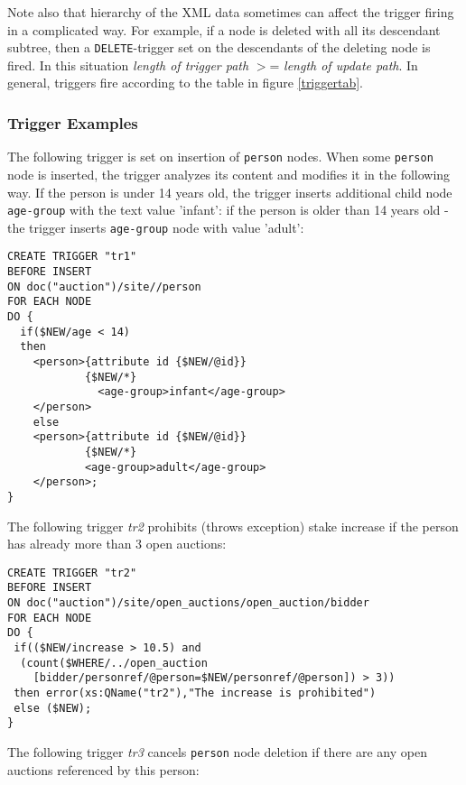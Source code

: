 \documentclass[a4paper,12pt]{article}
\begin{document}
Note also that hierarchy of the XML data sometimes can affect the trigger firing
in a complicated way. For example, if a node is deleted with all its descendant
subtree, then a \verb!DELETE!-trigger set on the descendants of the deleting
node is fired. In this situation \emph{length of trigger path} $>$= \emph{length
of update path}. In general, triggers fire according to the table in figure
\ref{triggertab}.


\subsubsection{Trigger Examples}

The following trigger is set on insertion of \verb!person! nodes. When some
\verb!person! node is inserted, the trigger analyzes its content and modifies it
in the following way. If the person is under 14 years old, the trigger inserts
additional child node \verb!age-group! with the text value 'infant': if the
person is older than 14 years old - the trigger inserts \verb!age-group! node
with value 'adult':

\small{
\begin{verbatim}
CREATE TRIGGER "tr1"
BEFORE INSERT
ON doc("auction")/site//person
FOR EACH NODE
DO {
  if($NEW/age < 14)
  then
    <person>{attribute id {$NEW/@id}}
            {$NEW/*}
              <age-group>infant</age-group>
    </person>
    else
    <person>{attribute id {$NEW/@id}}
            {$NEW/*}
            <age-group>adult</age-group>
    </person>;
}
\end{verbatim}}

The following trigger \emph{tr2} prohibits (throws exception) stake increase if
the person has already more than 3 open auctions:

\small{
\begin{verbatim}
CREATE TRIGGER "tr2"
BEFORE INSERT
ON doc("auction")/site/open_auctions/open_auction/bidder
FOR EACH NODE
DO {
 if(($NEW/increase > 10.5) and
  (count($WHERE/../open_auction
    [bidder/personref/@person=$NEW/personref/@person]) > 3))
 then error(xs:QName("tr2"),"The increase is prohibited")
 else ($NEW);
}
\end{verbatim}}

The following trigger \emph{tr3} cancels \verb!person! node deletion if there
are any open auctions referenced by this person:
\end{document}
